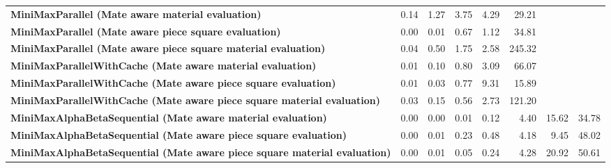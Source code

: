 \begin{table}[H]
{\begin{tabular}{|p{8cm}|*{7}{r|}}
            \rowcolor[HTML]{FFFFFF}
            \textbf{MiniMaxParallel (Mate aware material evaluation)}                                  & 0.14                                  & 1.27                                  & 3.75                                  & 4.29                                  & 29.21 &  &  \\
            \rowcolor[HTML]{EFEFEF}
            \textbf{MiniMaxParallel (Mate aware piece square evaluation)}                              & 0.00                                  & 0.01                                  & 0.67                                  & 1.12 & 34.81 &  &  \\
            \rowcolor[HTML]{FFFFFF}
            \textbf{MiniMaxParallel (Mate aware piece square material evaluation)}                     & 0.04                                  & 0.50 & 1.75 & 2.58 & 245.32 &  &  \\

            \rowcolor[HTML]{EFEFEF}
            \textbf{MiniMaxParallelWithCache (Mate aware material evaluation)}                         & 0.01                                  & 0.10                                  & 0.80 & 3.09 & 66.07 &  &  \\
            \rowcolor[HTML]{FFFFFF}
            \textbf{MiniMaxParallelWithCache (Mate aware piece square evaluation)}                     & 0.01                                  & 0.03 & 0.77 & 9.31 & 15.89 &  &  \\
            \rowcolor[HTML]{EFEFEF}
            \textbf{MiniMaxParallelWithCache (Mate aware piece square material evaluation)}            & 0.03 & 0.15 & 0.56 & 2.73 & 121.20 &  &  \\

            \rowcolor[HTML]{FFFFFF}
            \textbf{MiniMaxAlphaBetaSequential (Mate aware material evaluation)}                       & 0.00                                  & 0.00                                  & 0.01 & 0.12 & 4.40 & 15.62 & 34.78 \\
            \rowcolor[HTML]{EFEFEF}
            \textbf{MiniMaxAlphaBetaSequential (Mate aware piece square evaluation)}                   & 0.00                                  & 0.01 & 0.23 & 0.48 & 4.18 & 9.45 & 48.02 \\
            \rowcolor[HTML]{FFFFFF}
            \textbf{MiniMaxAlphaBetaSequential (Mate aware piece square material evaluation)}               & 0.00 & 0.01 & 0.05 & 0.24 & 4.28 & 20.92 & 50.61 \\


\end{tabular}}
\end{table}
